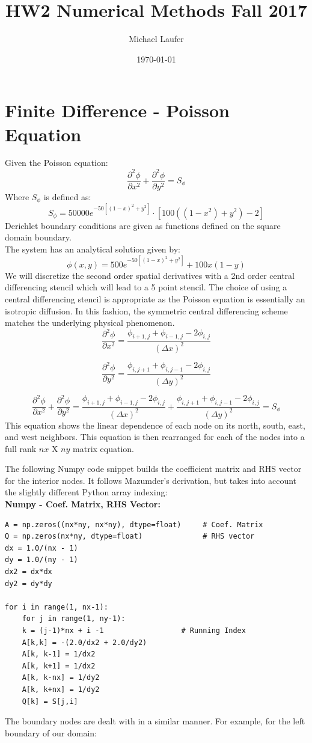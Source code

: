 \documentclass[11pt]{article}
\author{Michael Laufer}
\date{\today}
\title{HW2 Numerical Methods Fall 2017}
\begin{document}
\maketitle
\section{Finite Difference - Poisson Equation}
\label{sec-1}
Given the Poisson equation:
\[
\frac{\partial^{2} \phi}{\partial x^{2}} + \frac{\partial^{2} \phi}{\partial y^{2}} = S_{\phi}
\]
Where $S_{\phi}$ is defined as:
\[
S_{\phi}=50000 e^{ -50 \left[ \left( 1 - x \right)^{2}  + y^{2} \right] } \cdot \left[ 100 \left( \left( 1-x^{2}  \right)  + y^{2} \right) -2 \right]
\]
Derichlet boundary conditions are given as functions defined on the square domain boundary. \\
The system has an analytical solution given by:
\[
\phi \left( x,y \right) = 500 e^{-50 \left[ \left(1-x \right)^{2} + y^{2}\right] } + 100x \left( 1-y \right)
\]
We will discretize the second order spatial derivatives with a 2nd order central differencing stencil which will lead to a 5 point stencil. The choice of using a central differencing stencil is appropriate as the Poisson equation is essentially an isotropic diffusion. In this fashion, the symmetric central differencing scheme matches the underlying physical phenomenon. 
\[
\frac{\partial^{2} \phi}{\partial x^{2}} = \frac{\phi_{i+1,j} + \phi_{i-1,j} -2\phi_{i,j} }{\left(\Delta x \right)^{2}}
\]

\[
\frac{\partial^{2} \phi}{\partial y^{2}} = \frac{\phi_{i,j+1} + \phi_{i,j-1} -2\phi_{i,j} }{\left(\Delta y \right)^{2}}
\]

\[
\frac{\partial^{2} \phi}{\partial x^{2}} + \frac{\partial^{2} \phi}{\partial y^{2}}  = \frac{\phi_{i+1,j} + \phi_{i-1,j} -2\phi_{i,j} }{\left(\Delta x \right)^{2}} + \frac{\phi_{i,j+1} + \phi_{i,j-1} -2\phi_{i,j} }{\left(\Delta y \right)^{2}} = S_{\phi} 
\]
This equation  shows the linear dependence of each node on its north, south, east, and west neighbors. 
This equation is then rearranged for each of the nodes into a full rank $nx$ X $ny$ matrix equation.

The following Numpy code snippet builds the coefficient matrix and RHS vector for the interior nodes. It follows Mazumder's derivation, but takes into account the slightly different Python array indexing: \\

\textbf{Numpy - Coef. Matrix, RHS Vector:} 
\begin{verbatim}
A = np.zeros((nx*ny, nx*ny), dtype=float)     # Coef. Matrix
Q = np.zeros(nx*ny, dtype=float)              # RHS vector
dx = 1.0/(nx - 1)
dy = 1.0/(ny - 1)
dx2 = dx*dx
dy2 = dy*dy

for i in range(1, nx-1):
    for j in range(1, ny-1):
	k = (j-1)*nx + i -1                  # Running Index
	A[k,k] = -(2.0/dx2 + 2.0/dy2)
	A[k, k-1] = 1/dx2
	A[k, k+1] = 1/dx2
	A[k, k-nx] = 1/dy2
	A[k, k+nx] = 1/dy2
	Q[k] = S[j,i]
\end{verbatim}
The boundary nodes are dealt with in a similar manner. For example, for the left boundary of our domain:  \\
\end{document}
